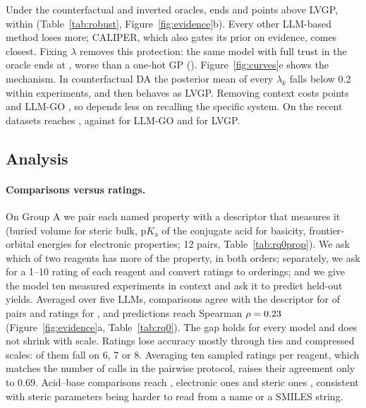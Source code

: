 Under the counterfactual and inverted oracles, \ours{} ends \CfGap{} and \InvGap{} points above LVGP, within \CfGapPct{} (Table~\ref{tab:robust}, Figure~\ref{fig:evidence}b). Every other LLM-based method loses more; CALIPER, which also gates its prior on evidence, comes closest. Fixing $\lambda$ removes this protection: the same model with full trust in the oracle ends at \CfFixed{}, worse than a one-hot GP (\OneHotA{}). Figure~\ref{fig:curves}e shows the mechanism. In counterfactual DA the posterior mean of every $\lambda_k$ falls below 0.2 within \LambdaCross{} experiments, and \ours{} then behaves as LVGP. Removing context costs \ours{} \DeconTacitCost{} points and LLM-GO \DeconLLMGOCost{}, so \ours{} depends less on recalling the specific system. On the recent datasets \ours{} reaches \PostTacit{}, against \PostLLMGO{} for LLM-GO and \PostLVGP{} for LVGP.

\subsection{Analysis}
\label{sec:analysis}

\paragraph{Comparisons versus ratings.}
On Group A we pair each named property with a descriptor that measures it (buried volume for steric bulk, p$K_\mathrm{a}$ of the conjugate acid for basicity, frontier-orbital energies for electronic properties; 12 pairs, Table~\ref{tab:rq0prop}). We ask which of two reagents has more of the property, in both orders; separately, we ask for a 1--10 rating of each reagent and convert ratings to orderings; and we give the model ten measured experiments in context and ask it to predict held-out yields. Averaged over five LLMs, comparisons agree with the descriptor for \PairAccPct{} of pairs and ratings for \RateAccPct{}, and predictions reach Spearman $\rho=0.23$ (Figure~\ref{fig:evidence}a, Table~\ref{tab:rq0}). The gap holds for every model and does not shrink with scale. Ratings lose accuracy mostly through ties and compressed scales: \RatingCompression{} of them fall on 6, 7 or 8. Averaging ten sampled ratings per reagent, which matches the number of calls in the pairwise protocol, raises their agreement only to 0.69. Acid--base comparisons reach \AccAcidBase{}, electronic ones \AccElec{} and steric ones \AccSteric{}, consistent with steric parameters being harder to read from a name or a SMILES string.

